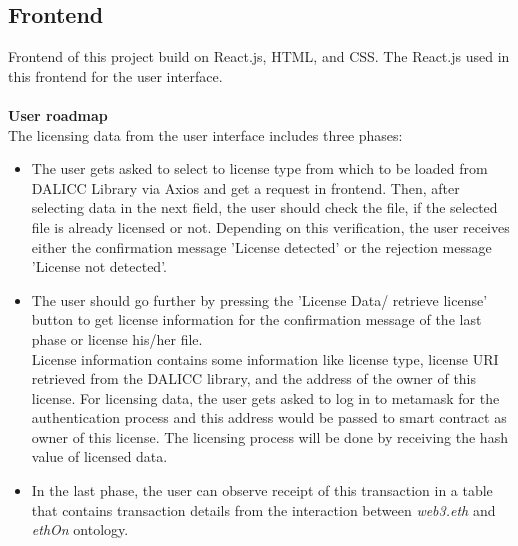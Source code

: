 \subsection{Frontend}
 Frontend of this project build on React.js, HTML, and CSS. The React.js used in this frontend for the user interface.\\
 \\
 \textbf{User roadmap}\\
 The licensing data from the user interface includes three phases:
 \begin{itemize}
 	\item The user gets asked to select to license type from which to be loaded from DALICC Library via Axios and get a request in frontend. Then, after selecting data in the next field, the user should check the file, if the selected file is already licensed or not. Depending on this verification, the user receives either the confirmation message 'License detected' or the rejection message 'License not detected'. 
 	\item The user should go further by pressing the 'License Data/ retrieve license' button to get license information for the confirmation message of the last phase or license his/her file.\\
 License information contains some information like license type, license URI retrieved from the DALICC library, and the address of the owner of this license. For licensing data, the user gets asked to log in to metamask for the authentication process and this address would be passed to smart contract as owner of this license. The licensing process will be done by receiving the hash value of licensed data.
 	\item In the last phase, the user can observe receipt of this transaction in a table that contains transaction details from the interaction between \textit{web3.eth} and \textit{ethOn} ontology.
 \end{itemize}
